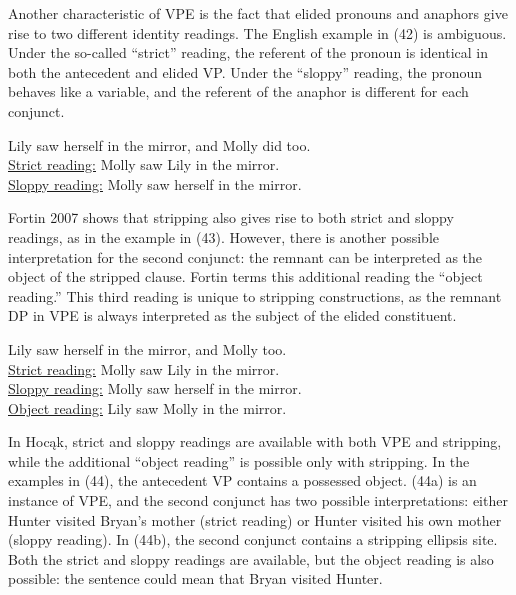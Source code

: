 \documentclass[output=paper]{LSP/langsci}
\begin{document}
Another characteristic of VPE is the fact that elided pronouns and anaphors give rise to two different identity readings. The English example in (42) is ambiguous. Under the so-called ``strict'' reading, the referent of the pronoun is identical in both the antecedent and elided VP. Under the ``sloppy'' reading, the pronoun behaves like a variable, and the referent of the anaphor is different for each conjunct.

\begin{exe}
\ex
Lily saw herself in the mirror, and Molly did too.\\
\underline{Strict reading:} Molly saw Lily in the mirror.\\
\underline{Sloppy reading:} Molly saw herself in the mirror.
\end{exe}

Fortin 2007 shows that stripping also gives rise to both strict and sloppy readings, as in the example in (43). However, there is another possible interpretation for the second conjunct: the remnant can be interpreted as the object of the stripped clause. Fortin terms this additional reading the ``object reading.'' This third reading is unique to stripping constructions, as the remnant DP in VPE is always interpreted as the subject of the elided constituent. 

\begin{exe}
\ex
Lily saw herself in the mirror, and Molly too.\\
\underline{Strict reading:} Molly saw Lily in the mirror.\\
\underline{Sloppy reading:} Molly saw herself in the mirror.\\
\underline{Object reading:} Lily saw Molly in the mirror.
\end{exe}

In Hoc\k{a}k, strict and sloppy readings are available with both VPE and stripping, while the additional ``object reading'' is possible only with stripping. In the examples in (44), the antecedent VP contains a possessed object. (44a) is an instance of VPE, and the second conjunct has two possible interpretations: either Hunter visited Bryan's mother (strict reading) or Hunter visited his own mother (sloppy reading). In (44b), the second conjunct contains a stripping ellipsis site. Both the strict and sloppy readings are available, but the object reading is also possible: the sentence could mean that Bryan visited Hunter.
\end{document}
